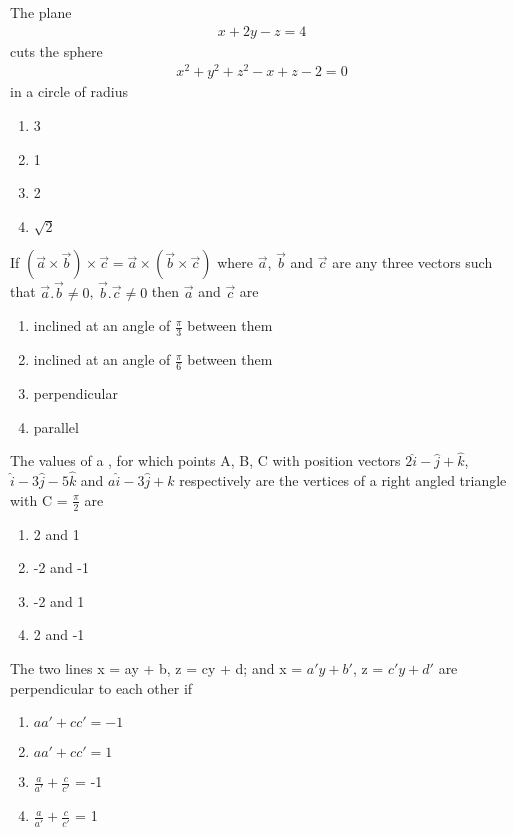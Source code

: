 \item The plane 
\begin{align*}
x + 2y - z = 4
\end{align*}
cuts the sphere
\begin{align}
x^2 + y^2 + z^2- x + z -2 = 0
\end{align}
in a circle of radius
\begin{enumerate}
\item 3
\item 1
\item 2
\item $\sqrt{2}$
\end{enumerate}

\item If $(\overrightarrow{a} \times \overrightarrow{b}) \times \overrightarrow{c}=\overrightarrow{a} \times (\overrightarrow{b} \times \overrightarrow{c})$ where $\overrightarrow{a}$, $\overrightarrow{b}$ and $\overrightarrow{c}$ are any three vectors such that $\overrightarrow{a}.\overrightarrow{b} \neq 0$, $\overrightarrow{b}.\overrightarrow{c} \neq 0$ then $\overrightarrow{a}$ and $\overrightarrow{c}$ are
\begin{enumerate}
\item inclined at an angle of $\frac{\pi}{3}$ between them
\item inclined at an angle of $\frac{\pi}{6}$ between them
\item perpendicular
\item parallel
\end{enumerate}

\item The values of a , for which points A, B, C with position vectors $2\hat{i} - \hat{j} + \hat{k}$, 
$\hat{i} - 3\hat{j} - 5\hat{k}$ and $a\hat{i} - 3\hat{j} + \hat{k}$ respectively are the vertices of a right angled triangle with C = $\frac{\pi}{2}$ are
\begin{enumerate}
\item 2 and 1
\item -2 and -1
\item -2 and 1
\item 2 and -1
\end{enumerate}

\item The two lines x = ay + b, z = cy + d; and x = $a'y + b'$, z = $c'y + d'$ are perpendicular to each other if
\begin{enumerate}
\item $aa' + cc' = -1$
\item $aa' + cc' = 1$
\item $\frac{a}{a'} + \frac{c}{c'}$ = -1
\item $\frac{a}{a'} + \frac{c}{c'}$ = 1
\end{enumerate}

